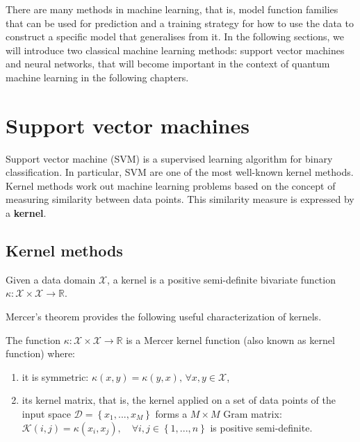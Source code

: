 There are many methods in machine learning, that is, model function families that can be used for prediction and a training strategy for how to use the data to construct a specific model that generalises from it. In the following sections, we will introduce two classical machine learning methods: support vector machines and neural networks, that will become important in the context of quantum machine learning in the following chapters. 


\section{Support vector machines}

 Support vector machine (SVM) is a supervised learning algorithm for binary classification. In particular, SVM are one of the most well-known kernel methods. Kernel methods work out machine learning problems based on the concept of measuring similarity between data points. This similarity measure is expressed by a \textbf{kernel}.
 

 \subsection{Kernel methods}\label{subs:kernel-methods}
 \begin{definicion}[Kernel]
     Given a data domain $\mathcal{X}$, a kernel is a positive semi-definite bivariate function $\kappa : \mathcal{X} \times \mathcal{X} \longrightarrow \mathbb{R}. $ 
 \end{definicion}
 
 Mercer's theorem provides the following useful characterization of kernels.
 \begin{teorema}
     The function $\kappa: \mathcal{X} \times \mathcal{X} \longrightarrow \mathbb{R}$ is a Mercer kernel function (also known as kernel function) where:
     \begin{enumerate}
         \item it is symmetric: $\kappa (x,y) = \kappa(y,x), \, \forall x,y \in \mathcal{X}$,
         \item its kernel matrix, that is, the kernel applied on a set of data points of the input space $\mathcal{D}=\left \lbrace x_1,...,x_M\right\rbrace $ forms a $M \times M$ Gram matrix: $\mathcal{K}(i,j)=\kappa(x_i, x_j), \quad \forall i,j \in \left\lbrace1,...,n\right\rbrace$ is positive semi-definite.
     \end{enumerate}     
 \end{teorema}

